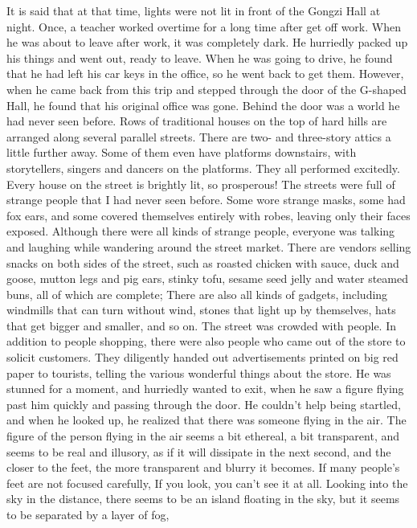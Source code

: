 It is said that at that time, lights were not lit in front of the Gongzi Hall
at night.  Once, a teacher worked overtime for a long time after get off work.
When he was about to leave after work, it was completely dark.  He hurriedly
packed up his things and went out, ready to leave. When he was going to drive,
he found that he had left his car keys in the office, so he went back to get
them.  However, when he came back from this trip and stepped through the door
of the G-shaped Hall, he found that his original office was gone. Behind the
door was a world he had never seen before.  Rows of traditional houses on the
top of hard hills are arranged along several parallel streets. There are two-
and three-story attics a little further away. Some of them even have platforms
downstairs, with storytellers, singers and dancers on the platforms. They all
performed excitedly.  Every house on the street is brightly lit, so prosperous!
The streets were full of strange people that I had never seen before. Some wore
strange masks, some had fox ears, and some covered themselves entirely with
robes, leaving only their faces exposed.  Although there were all kinds of
strange people, everyone was talking and laughing while wandering around the
street market.  There are vendors selling snacks on both sides of the street,
such as roasted chicken with sauce, duck and goose, mutton legs and pig ears,
stinky tofu, sesame seed jelly and water steamed buns, all of which are
complete; There are also all kinds of gadgets, including windmills that can
turn without wind, stones that light up by themselves, hats that get bigger and
smaller, and so on.  The street was crowded with people. In addition to people
shopping, there were also people who came out of the store to solicit
customers. They diligently handed out advertisements printed on big red paper
to tourists, telling the various wonderful things about the store.  He was
stunned for a moment, and hurriedly wanted to exit, when he saw a figure flying
past him quickly and passing through the door.  He couldn't help being
startled, and when he looked up, he realized that there was someone flying in
the air.  The figure of the person flying in the air seems a bit ethereal, a
bit transparent, and seems to be real and illusory, as if it will dissipate in
the next second, and the closer to the feet, the more transparent and blurry it
becomes. If many people's feet are not focused carefully, If you look, you
can't see it at all.  Looking into the sky in the distance, there seems to be
an island floating in the sky, but it seems to be separated by a layer of fog,
